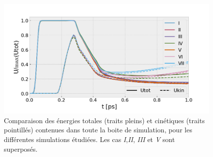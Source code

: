 \begin{refsection}
\begin{figure}[hbtp]
	\centering
	\includegraphics[width=0.7\linewidth]{4-simulation/comparaison_U.png}
	\caption{Comparaison des énergies totales (traits pleins) et cinétiques (traits pointillés) contenues dans toute la boite de simulation, pour les différentes simulations étudiées. Les cas \textit{I},\textit{II}, \textit{III} et \textit{V} sont superposés.}
	\label{fig:4-PIC_chauffage_numerique}
\end{figure}


\end{refsection}
